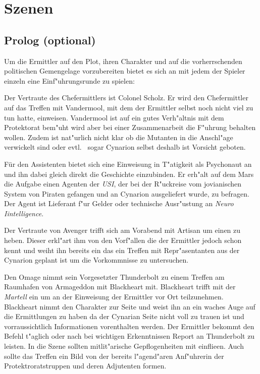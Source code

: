 \section{Szenen}

\subsection{Prolog (optional)}

Um die Ermittler auf den Plot, ihren Charakter und auf die vorherrschenden politischen Gemengelage vorzubereiten bietet es sich an mit jedem der Spieler einzeln eine Einf"uhrungsrunde zu spielen:

Der Vertraute des Chefermittlers ist Colonel Scholz. Er wird den Chefermittler auf das Treffen mit Vandermool, mit dem der Ermittler selbst noch nicht viel zu tun hatte, einweisen. Vandermool ist auf ein gutes Verh"altnis mit dem Protektorat bem"uht wird aber bei einer Zusammenarbeit die F"uhrung behalten wollen. Zudem ist nat"urlich nicht klar ob die Mutanten in die Anschl"age verwickelt sind oder evtl. ~sogar Cynarion selbst deshalb ist Vorsicht geboten.

Für den Assistenten bietet sich eine Einweisung in T"atigkeit als Psychonaut an und ihn dabei gleich direkt die Geschichte einzubinden. Er erh"alt auf dem Mars die Aufgabe einen Agenten der \emph{USI}, der bei der R"uckreise vom jovianischen System von Piraten gefangen und an Cynarion ausgeliefert wurde, zu befragen. Der Agent ist Lieferant f"ur Gelder oder technische Ausr"ustung an \emph{Neuro Iintelligence}.

Der Vertraute von Avenger trifft sich am Vorabend mit Artisan um einen zu heben. Dieser erkl"art ihm von den Vorf"allen die der Ermittler jedoch schon kennt und weiht ihn bereits ein das ein Treffen mit Repr"asentanten aus der Cynarion geplant ist um die Vorkommnisse zu untersuchen.

Den Omage nimmt sein Vorgesetzter Thunderbolt zu einem Treffen am Raumhafen von Armageddon mit Blackheart mit. Blackheart trifft mit der \emph{Martell} ein um an der Einweisung der Ermittler vor Ort teilzunehmen. Blackheart nimmt den Charakter zur Seite und weist ihn an ein waches Auge auf die Ermittlungen zu haben da der Cynarian Seite nicht voll zu trauen ist und vorraussichtlich Informationen vorenthalten werden.
Der Ermittler bekommt den Befehl t"aglich oder nach bei wichtigen Erkenntnissen Report an Thunderbolt zu leisten. In die Szene sollten mitlit"arische Gepflogenheiten mit einflie\3en. Auch sollte das Treffen ein Bild von der bereits l"agend"aren Anf"uhrerin der Protektroratstruppen und deren Adjutenten formen.

